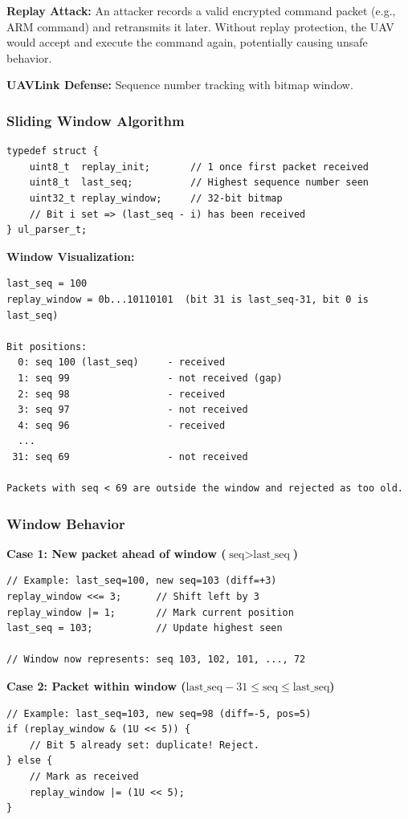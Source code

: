 \documentclass[11pt,a4paper]{article}
\begin{document}
\textbf{Replay Attack:} An attacker records a valid encrypted command packet (e.g., ARM command) and retransmits it later. Without replay protection, the UAV would accept and execute the command again, potentially causing unsafe behavior.

\textbf{UAVLink Defense:} Sequence number tracking with bitmap window.

\subsubsection{Sliding Window Algorithm}

\begin{lstlisting}[caption={Replay Window Data Structure}]
typedef struct {
    uint8_t  replay_init;       // 1 once first packet received
    uint8_t  last_seq;          // Highest sequence number seen
    uint32_t replay_window;     // 32-bit bitmap
    // Bit i set => (last_seq - i) has been received
} ul_parser_t;
\end{lstlisting}

\textbf{Window Visualization:}
\begin{lstlisting}[language={}]
last_seq = 100
replay_window = 0b...10110101  (bit 31 is last_seq-31, bit 0 is last_seq)

Bit positions:
  0: seq 100 (last_seq)     - received
  1: seq 99                 - not received (gap)
  2: seq 98                 - received
  3: seq 97                 - not received
  4: seq 96                 - received
  ...
 31: seq 69                 - not received

Packets with seq < 69 are outside the window and rejected as too old.
\end{lstlisting}

\subsubsection{Window Behavior}

\textbf{Case 1: New packet ahead of window ($\text{seq} > \text{last\_seq}$)}
\begin{lstlisting}
// Example: last_seq=100, new seq=103 (diff=+3)
replay_window <<= 3;      // Shift left by 3
replay_window |= 1;       // Mark current position
last_seq = 103;           // Update highest seen

// Window now represents: seq 103, 102, 101, ..., 72
\end{lstlisting}

\textbf{Case 2: Packet within window ($\text{last\_seq} - 31 \leq \text{seq} \leq \text{last\_seq}$)}
\begin{lstlisting}
// Example: last_seq=103, new seq=98 (diff=-5, pos=5)
if (replay_window & (1U << 5)) {
    // Bit 5 already set: duplicate! Reject.
} else {
    // Mark as received
    replay_window |= (1U << 5);
}
\end{lstlisting}
\end{document}

